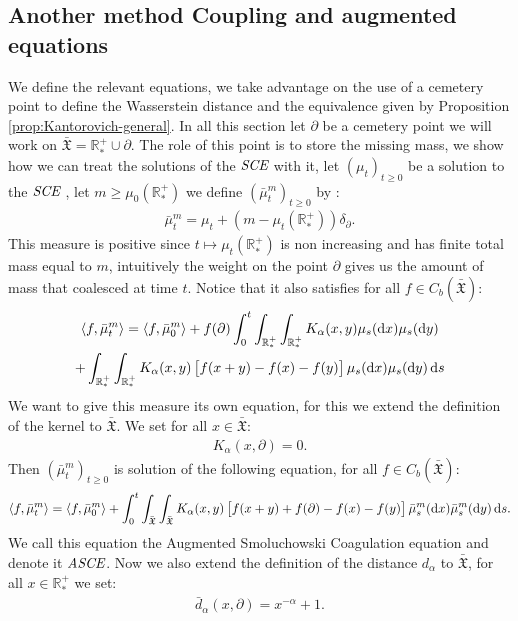 \documentclass[11pt,a4paper]{article}
\newcommand{\RRP}{\mathbb{R}^+_*}
\newcommand{\XF}{\mathfrak{X}}
\newcommand{\SCE}{\emph{SCE}}
\newcommand{\ASCE}{{\emph{ASCE}}}
\newcommand{\Proc}[1]{\left(#1\right)_{t\geq 0}}
\newcommand{\brac}[1]{\left\langle#1\right\rangle}
\newcommand{\dd}{\mathop{}\!\mathrm{d}}
\begin{document}
\subsection{Another method Coupling and augmented equations}
We define the relevant equations, we take advantage on the use of a cemetery point to define the Wasserstein distance and the equivalence given by Proposition \ref{prop:Kantorovich-general}. In all this section let $\partial$ be a cemetery point we will work on $\bar{\XF} = \RRP \cup {\partial}$. The role of this point is to store the missing mass, we show how we can treat the solutions of the $\SCE$ with it, let $\Proc{\mu_t}$ be a solution to the $\SCE$ , let $m \geq \mu_0(\RRP)$ we define $\Proc{\bar{\mu}^m_t}$ by :
\begin{align*}
    \bar{\mu}^m_t = \mu_t + \left(m - \mu_t(\RRP) \right)\delta_\partial.
\end{align*}
This measure is positive since $t \mapsto \mu_t(\RRP)$ is non increasing and has finite total mass equal to $m$, intuitively the weight on the point $\partial$ gives us the amount of mass that coalesced at time $t$. Notice that it also satisfies for all $f \in C_b(\bar{\XF})$:
\begin{multline*}
    \brac{f,\bar{\mu}^m_t} = \brac{f,\bar{\mu}^m_0} + f(\partial) \int_0^t\int_{\RRP} \int_{\RRP} K_\alpha(x,y)\mu_s(\dd x) \mu_s(\dd y) \\
    + \int_{\RRP} \int_{\RRP} K_\alpha(x,y) \left[\vphantom{A^2}f(x+y)  -f(x) -f(y)\right]\mu_s(\dd x) \mu_s(\dd y) \dd s
\end{multline*}
We want to give this measure its own equation, for this we extend the definition of the kernel to $\bar{\XF}$. We set for all $x \in \bar{\XF}$:
\begin{align*}
    K_{\alpha}(x,\partial) = 0.
\end{align*}
Then $\Proc{\bar{\mu}^m_t}$ is solution of the following equation, for all $f \in C_b(\bar{\XF})$:
\begin{align*}
    \brac{f,\bar{\mu}^m_t} = \brac{f,\bar{\mu}^m_0} + \int_0^t \int_{\bar{\XF}} \int_{\bar{\XF}} K_\alpha(x,y) \left[\vphantom{A^2}f(x+y) + f(\partial) -f(x) -f(y)\right]\bar{\mu}^m_s(\dd x) \bar{\mu}^m_s(\dd y) \dd s.
\end{align*}
We call this equation the Augmented Smoluchowski Coagulation equation and denote it $\ASCE$. Now we also extend the definition of the distance $d_\alpha$ to $\bar{\XF}$, for all $x \in \RRP$ we set:
\begin{align*}
    \bar{d}_\alpha(x,\partial) = x^{-\alpha} + 1.
\end{align*}
\end{document}
